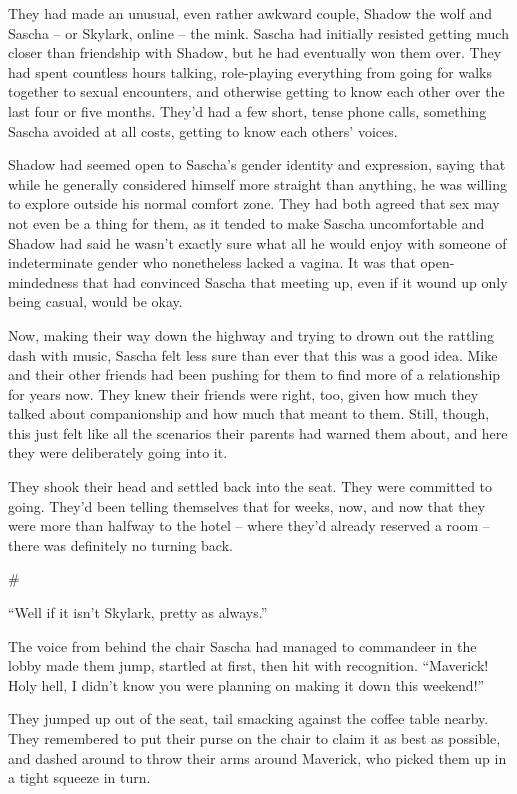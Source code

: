 \documentclass[12pt,letterpaper,oneside]{memoir}
\newcommand\secdiv{
  \begin{center}
    \#
  \end{center}
}
\begin{document}
  They had made an unusual, even rather awkward couple, Shadow the wolf and Sascha -- or Skylark, online -- the mink. Sascha had initially resisted getting much closer than friendship with Shadow, but he had eventually won them over. They had spent countless hours talking, role-playing everything from going for walks together to sexual encounters, and otherwise getting to know each other over the last four or five months. They'd had a few short, tense phone calls, something Sascha avoided at all costs, getting to know each others' voices.

  Shadow had seemed open to Sascha's gender identity and expression, saying that while he generally considered himself more straight than anything, he was willing to explore outside his normal comfort zone. They had both agreed that sex may not even be a thing for them, as it tended to make Sascha uncomfortable and Shadow had said he wasn't exactly sure what all he would enjoy with someone of indeterminate gender who nonetheless lacked a vagina. It was that open-mindedness that had convinced Sascha that meeting up, even if it wound up only being casual, would be okay.

  Now, making their way down the highway and trying to drown out the rattling dash with music, Sascha felt less sure than ever that this was a good idea. Mike and their other friends had been pushing for them to find more of a relationship for years now. They knew their friends were right, too, given how much they talked about companionship and how much that meant to them. Still, though, this just felt like all the scenarios their parents had warned them about, and here they were deliberately going into it.

  They shook their head and settled back into the seat. They were committed to going. They'd been telling themselves that for weeks, now, and now that they were more than halfway to the hotel -- where they'd already reserved a room -- there was definitely no turning back.

  \secdiv

  ``Well if it isn't Skylark, pretty as always.''

  The voice from behind the chair Sascha had managed to commandeer in the lobby made them jump, startled at first, then hit with recognition. ``Maverick! Holy hell, I didn't know you were planning on making it down this weekend!''

  They jumped up out of the seat, tail smacking against the coffee table nearby.  They remembered to put their purse on the chair to claim it as best as possible, and dashed around to throw their arms around Maverick, who picked them up in a tight squeeze in turn.
\end{document}
